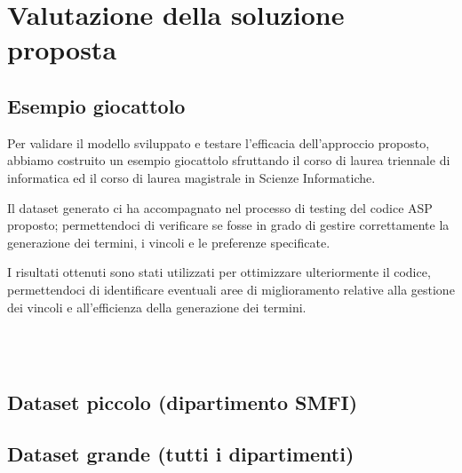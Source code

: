 \section{Valutazione della soluzione proposta}
\label{sec:expval}

\subsection{Esempio giocattolo}
\label{sec:-dataset-giocattolo}


Per validare il modello sviluppato e testare l’efficacia dell’approccio proposto,
abbiamo costruito un esempio giocattolo sfruttando il corso di laurea triennale di informatica
ed il corso di laurea magistrale in Scienze Informatiche.

Il dataset generato ci ha accompagnato nel processo di testing del codice ASP proposto;
permettendoci di verificare se fosse in grado di gestire correttamente la generazione dei termini,
i vincoli e le preferenze specificate.

I risultati ottenuti sono stati utilizzati per ottimizzare ulteriormente il codice,
permettendoci di identificare eventuali aree di miglioramento relative alla gestione
dei vincoli e all'efficienza della generazione dei termini.

 \\
 \\

\subsection{Dataset piccolo (dipartimento SMFI)}
\label{sec:-dataset-dipartimento-smfi}

\subsection{Dataset grande (tutti i dipartimenti)}
\label{sec:dataset-tutti-dipartimenti}